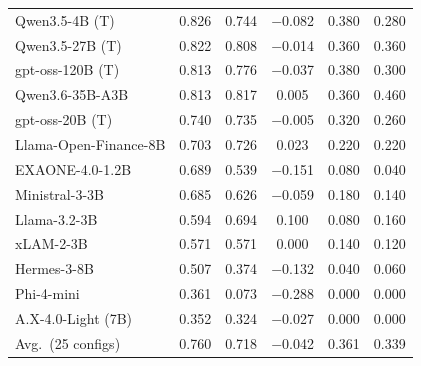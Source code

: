 \begin{table}[t]
\begin{tabular}{lccccc}
Qwen3.5-4B (T)~\cite{qwen3.5} & 0.826 & 0.744 & $-$0.082 & 0.380 & 0.280 \\
Qwen3.5-27B (T)~\cite{qwen3.5} & 0.822 & 0.808 & $-$0.014 & 0.360 & 0.360 \\
gpt-oss-120B (T)~\cite{openai2025gptoss} & 0.813 & 0.776 & $-$0.037 & 0.380 & 0.300 \\
Qwen3.6-35B-A3B~\cite{qwen36_35b_a3b} & 0.813 & 0.817 & 0.005 & 0.360 & 0.460 \\
gpt-oss-20B (T)~\cite{openai2025gptoss} & 0.740 & 0.735 & $-$0.005 & 0.320 & 0.260 \\
Llama-Open-Finance-8B & 0.703 & 0.726 & 0.023 & 0.220 & 0.220 \\
EXAONE-4.0-1.2B~\cite{bae2025exaone} & 0.689 & 0.539 & $-$0.151 & 0.080 & 0.040 \\
Ministral-3-3B~\cite{liu2026ministral3} & 0.685 & 0.626 & $-$0.059 & 0.180 & 0.140 \\
Llama-3.2-3B~\cite{grattafiori2024llama3} & 0.594 & 0.694 & 0.100 & 0.080 & 0.160 \\
xLAM-2-3B~\cite{prabhakar2025apigenmt} & 0.571 & 0.571 & 0.000 & 0.140 & 0.120 \\
Hermes-3-8B~\cite{teknium2024hermes3} & 0.507 & 0.374 & $-$0.132 & 0.040 & 0.060 \\
Phi-4-mini~\cite{microsoft2025phi4mini} & 0.361 & 0.073 & $-$0.288 & 0.000 & 0.000 \\
A.X-4.0-Light (7B) & 0.352 & 0.324 & $-$0.027 & 0.000 & 0.000 \\
\midrule
Avg.\ (25 configs) & 0.760 & 0.718 & $-$0.042 & 0.361 & 0.339 \\
\bottomrule
\end{tabular}

\end{table}
